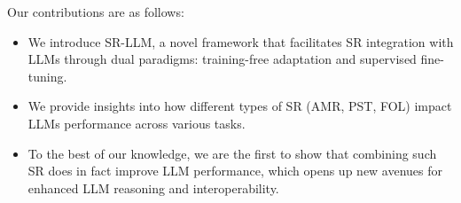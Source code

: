 
Our contributions are as follows:
\begin{itemize}
    \item We introduce SR-LLM, a novel framework that facilitates SR integration with LLMs through dual paradigms: training-free adaptation and supervised fine-tuning.
    \item We provide insights into how different types of SR (AMR, PST, FOL) impact LLMs performance across various tasks.
    \item To the best of our knowledge, we are the first to show that combining such SR does in fact improve LLM performance, which opens up new avenues for enhanced LLM reasoning and interoperability.
\end{itemize}
